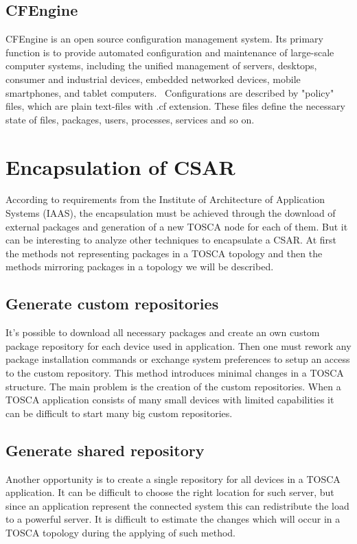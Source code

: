 \subsection*{CFEngine}
CFEngine is an open source configuration management system.
Its primary function is to provide automated configuration and maintenance of large-scale computer systems, including the unified management of servers, desktops, consumer and industrial devices, embedded networked devices, mobile smartphones, and tablet computers.~\cite{cfengine}
Configurations are described by "policy" files, which are plain text-files with .cf extension.
These files define the necessary state of files, packages, users, processes, services and so on.~\cite{cfengine2}

\section{Encapsulation of CSAR}
According to requirements from the Institute of Architecture of Application Systems (IAAS), the encapsulation must be achieved through the download of external packages and generation of a new TOSCA node for each of them. 
But it can be interesting to analyze other techniques to encapsulate a CSAR. 
At first the methods not representing packages in a TOSCA topology and then the methods mirroring packages in a topology we will be described.\\

\subsection*{Generate custom repositories}
It's possible to download all necessary packages and create an own custom package repository for each device used in application. 
Then one must rework any package installation commands or exchange system preferences to setup an access to the custom repository.
This method introduces minimal changes in a TOSCA structure.
The main problem is the creation of the custom repositories. 
When a TOSCA application consists of many small devices with limited capabilities it can be difficult to start many big custom repositories.

\subsection*{Generate shared repository}
Another opportunity is to create a single repository for all devices in a TOSCA application.
It can be difficult to choose the right location for such server, but since an application represent the connected system this can redistribute the load to a powerful server.
It is difficult to estimate the changes which will occur in a TOSCA topology during the applying of such method.

